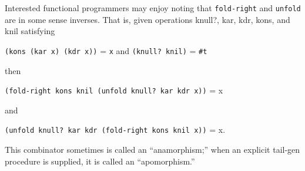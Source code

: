 \begin{entry}{%
  }
Interested functional programmers may enjoy noting that
\texttt{fold-right} and \texttt{unfold} are in some sense
inverses. That is, given operations knull?, kar, kdr, kons, and knil
satisfying

\texttt{(kons\ (kar\ x)\ (kdr\ x))} = \texttt{x} and \texttt{(knull?\
  knil)} = \texttt{\#t}

then

\texttt{(fold-right\ kons\ knil\ (unfold\ knull?\ kar\ kdr\ x))} = x

and

\texttt{(unfold\ knull?\ kar\ kdr\ (fold-right\ kons\ knil\ x))} = x.

This combinator sometimes is called an ``anamorphism;'' when an
explicit tail-gen procedure is supplied, it is called an
``apomorphism.''
\end{entry}

